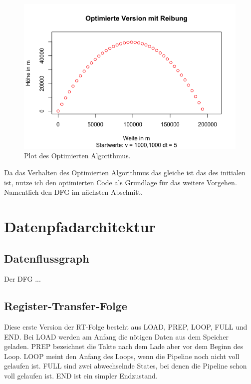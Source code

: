 \documentclass{artilcle}
\begin{document}
    \begin{figure}[!htbp]
        \includegraphics[width=\textwidth]{../Ballistiken/PlotExports/Optimiert.png}
        \caption{Plot des Optimierten Algorithmus.}
        \label{Ortsplot initial}
    \end{figure}

    Da das Verhalten des Optimierten Algorithmus das gleiche ist das des initialen ist, nutze ich den
    optimierten Code als Grundlage für das weitere Vorgehen. Namentlich den DFG im nächsten Abschnitt.


    \section{Datenpfadarchitektur}

    \subsection{Datenflussgraph}

    Der DFG ...

    
    \subsection{Register-Transfer-Folge}

    Diese erste Version der RT-Folge besteht aus LOAD, PREP, LOOP, FULL und END.
    Bei LOAD werden am Anfang die nötigen Daten aus dem Speicher geladen.
    PREP bezeichnet die Takte nach dem Lade aber vor dem Beginn des Loop.
    LOOP meint den Anfang des Loops, wenn die Pipeline noch nicht voll gelaufen ist.
    FULL sind zwei abwechselnde States, bei denen die Pipeline schon voll gelaufen ist.
    END ist ein simpler Endzustand.
\end{document}
